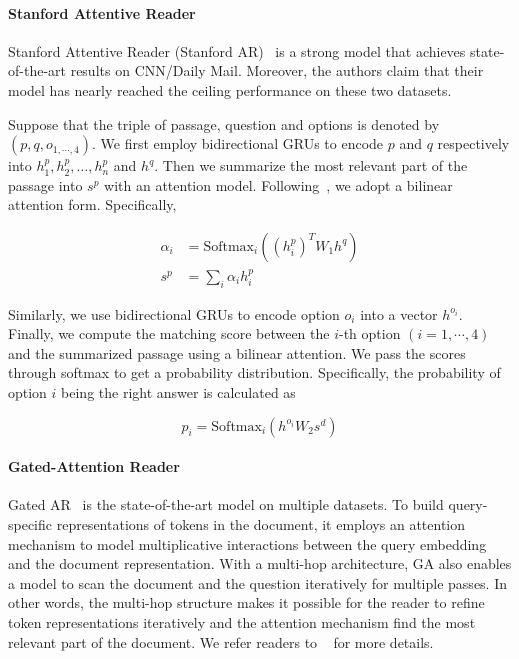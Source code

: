 \paragraph{Stanford Attentive Reader} Stanford Attentive Reader (Stanford AR)~\citep{chen2016thorough} is a strong model that achieves state-of-the-art results on { CNN/Daily Mail}. Moreover, the authors claim that their model has nearly reached the ceiling performance on these two datasets. 

Suppose that the triple of passage, question and options is denoted by $(p, q, o_{1, \cdots, 4})$. We first employ bidirectional GRUs to encode $p$ and $q$ respectively into $h^p_{1}, h^p_{2}, \dots, h^p_{n}$ and $h^q$. Then we summarize the most relevant part of the passage into $s^{p}$ with an attention model. Following~\citet{chen2016thorough}, we adopt a bilinear attention form. Specifically,

\begin{equation}
\begin{aligned}
\alpha_i &= \mathrm{Softmax}_i((h^p_{i})^T W_1 h^q)\\
s^p &= \sum_i \alpha_i h^p_{i}
\end{aligned}
\end{equation}

Similarly, we use bidirectional GRUs to encode option $o_i$ into a vector $h^{o_i}$. Finally, we compute the matching score between the $i$-th option $(i=1, \cdots, 4)$ and the summarized passage using a bilinear attention. We pass the scores through softmax to get a probability distribution. Specifically, the probability of option $i$ being the right answer is calculated as

\begin{equation}
p_i = \mathrm{Softmax}_i(h^{o_i} W_2 s^d)
\label{eq:output_prob}
\end{equation}

\paragraph{Gated-Attention Reader} Gated AR~\citep{dhingra2016gated} is the state-of-the-art model on multiple datasets. To build query-specific representations of tokens in the document, it employs an attention mechanism to model multiplicative interactions between the query embedding and the document representation. With a multi-hop architecture, GA also enables a model to scan the document and the question iteratively for multiple passes. In other words, the multi-hop structure makes it possible for the reader to refine token representations iteratively and the attention mechanism find the most relevant part of the document. We refer readers to ~\citep{dhingra2016gated} for more details. 

